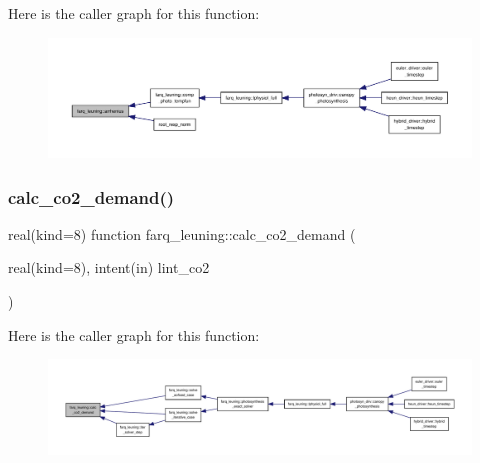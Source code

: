 Here is the caller graph for this function\+:
\nopagebreak
\begin{figure}[H]
\begin{center}
\leavevmode
\includegraphics[width=350pt]{namespacefarq__leuning_a6d031c781aa0a5b3a55dd340813a2c33_icgraph}
\end{center}
\end{figure}
\mbox{\label{namespacefarq__leuning_adcca2c24ca270f8fc0509c5e71906eff}} 
\subsubsection{\texorpdfstring{calc\+\_\+co2\+\_\+demand()}{calc\_co2\_demand()}}
{\footnotesize\ttfamily real(kind=8) function farq\+\_\+leuning\+::calc\+\_\+co2\+\_\+demand (\begin{DoxyParamCaption}\item[{real(kind=8), intent(in)}]{lint\+\_\+co2 }\end{DoxyParamCaption})}

Here is the caller graph for this function\+:
\nopagebreak
\begin{figure}[H]
\begin{center}
\leavevmode
\includegraphics[width=350pt]{namespacefarq__leuning_adcca2c24ca270f8fc0509c5e71906eff_icgraph}
\end{center}
\end{figure}
\mbox{\label{namespacefarq__leuning_a4ea88f530f197b5a15c695c83e15e1a1}} 
